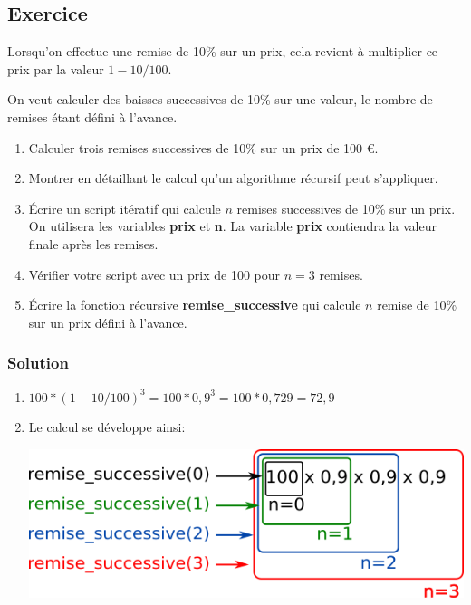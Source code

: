 \documentclass[12pt]{article}
\providecommand{\tightlist}{%
      \setlength{\itemsep}{0pt}\setlength{\parskip}{0pt}}
\begin{document}
    \hypertarget{exercice}{%
\subsection*{Exercice}\label{exercice}}

Lorsqu'on effectue une remise de 10\% sur un prix, cela revient à
multiplier ce prix par la valeur \(1-10/100\).

On veut calculer des baisses successives de 10\% sur une valeur, le
nombre de remises étant défini à l'avance.

\begin{enumerate}
\def\labelenumi{\arabic{enumi}.}
\tightlist
\item
  Calculer trois remises successives de 10\% sur un prix de 100 €.
\item
  Montrer en détaillant le calcul qu'un algorithme récursif peut
  s'appliquer.
\item
  Écrire un script itératif qui calcule \(n\) remises successives de
  10\% sur un prix. On utilisera les variables \textbf{prix} et
  \textbf{n}. La variable \textbf{prix} contiendra la valeur finale
  après les remises.
\item
  Vérifier votre script avec un prix de 100 pour \(n=3\) remises.
\item
  Écrire la fonction récursive \textbf{remise\_successive} qui calcule
  \(n\) remise de 10\% sur un prix défini à l'avance.
\end{enumerate}

    \hypertarget{solution}{%
\subsubsection*{Solution}\label{solution}}

\begin{enumerate}
\def\labelenumi{\arabic{enumi}.}
\tightlist
\item
  \(100*(1-10/100)^{3}=100*0,9^{3}=100*0,729=72,9\)
\item
  Le calcul se développe ainsi:
  
 \begin{center}
  \includegraphics{img/remise_successive.png}
 \end{center}
\end{enumerate}
\end{document}
